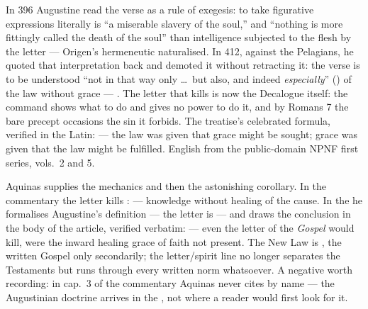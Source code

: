 \begin{witnessnote}
In 396 Augustine read the verse as a rule of exegesis: to take figurative
expressions literally is ``a miserable slavery of the soul,'' and ``nothing
is more fittingly called the death of the soul'' than intelligence subjected
to the flesh by the letter --- Origen's hermeneutic naturalised. In 412,
against the Pelagians, he quoted that interpretation back and demoted it
without retracting it: the verse is to be understood ``not in that way only
\dots\ but also, and indeed \textit{especially}'' ()
of the law without grace --- . The letter that kills is now the Decalogue itself: the
command shows what to do and gives no power to do it, and by Romans 7 the
bare precept occasions the sin it forbids. The treatise's celebrated
formula, verified in the Latin:  --- the law was given that
grace might be sought; grace was given that the law might be fulfilled.
English from the public-domain NPNF first series, vols.\ 2 and 5.
\end{witnessnote}

\begin{witnessnote}
Aquinas supplies the mechanics and then the astonishing corollary. In the
commentary the letter kills :  --- knowledge without healing of the cause. In the
 he formalises Augustine's definition --- the letter is
 --- and draws the conclusion
in the body of the article, verified verbatim:  --- even the
letter of the \textit{Gospel} would kill, were the inward healing grace of
faith not present. The New Law is , the written Gospel only secondarily; the letter/spirit
line no longer separates the Testaments but runs through every written norm
whatsoever. A negative worth recording: in cap.~3 of the commentary Aquinas
never cites  by name --- the Augustinian doctrine
arrives in the , not where a reader would first look for it.
\end{witnessnote}

